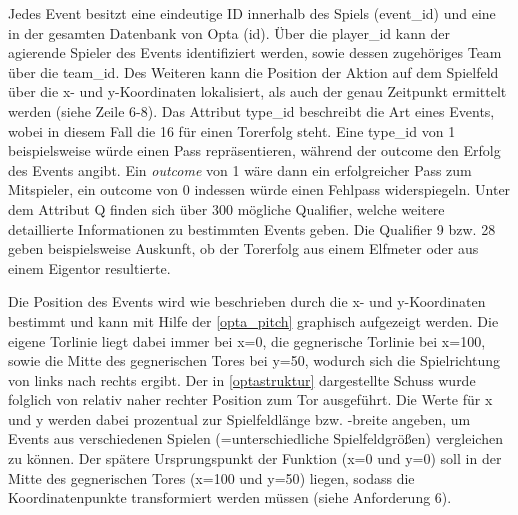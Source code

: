 Jedes Event besitzt eine eindeutige ID innerhalb des Spiels (\textsf{\glqq event\_id\grqq}) und eine in der gesamten Datenbank von Opta (\textsf{\glqq id\grqq}). Über die \textsf{\glqq player\_id\grqq} kann der agierende Spieler des Events identifiziert werden, sowie dessen zugehöriges Team über die \textsf{\glqq team\_id\grqq}. Des Weiteren kann die Position der Aktion auf dem Spielfeld über die \textsf{\glqq x\grqq}- und \textsf{\glqq y\grqq}-Koordinaten lokalisiert, als auch der genau Zeitpunkt ermittelt werden (siehe Zeile 6-8). Das Attribut \textsf{\glqq type\_id\grqq} beschreibt die Art eines Events, wobei in diesem Fall die \textsf{16} für einen Torerfolg steht. Eine \textsf{\glqq type\_id\grqq} von \textsf{1} beispielsweise würde einen Pass repräsentieren, während der \textsf{\glqq outcome\grqq} den Erfolg des Events angibt. Ein \textit{\glqq outcome\grqq} von \textsf{1} wäre dann ein erfolgreicher Pass zum Mitspieler, ein \textsf{\glqq outcome\grqq} von \textsf{0} indessen würde einen Fehlpass widerspiegeln. Unter dem Attribut \textsf{\glqq Q\grqq} finden sich über 300 mögliche Qualifier, welche weitere detaillierte Informationen zu bestimmten Events geben. Die Qualifier \textsf{9} bzw. \textsf{28} geben beispielsweise Auskunft, ob der Torerfolg aus einem Elfmeter oder aus einem Eigentor resultierte.
\enlargethispage{2\baselineskip} 

Die Position des Events wird wie beschrieben durch die \textsf{\glqq x\grqq}- und \textsf{\glqq y\grqq}-Koordinaten bestimmt und kann mit Hilfe der \vref{opta_pitch} graphisch aufgezeigt werden. Die eigene Torlinie liegt dabei immer bei \textsf{x=0}, die gegnerische Torlinie bei \textsf{x=100}, sowie die Mitte des gegnerischen Tores bei \textsf{y=50}, wodurch sich die Spielrichtung von links nach rechts ergibt. Der in \vref{optastruktur} dargestellte Schuss wurde folglich von relativ naher rechter Position zum Tor ausgeführt. Die Werte für x und y werden dabei prozentual zur Spielfeldlänge bzw. -breite angeben, um Events aus verschiedenen Spielen (=unterschiedliche Spielfeldgrößen) vergleichen zu können. Der spätere Ursprungspunkt der Funktion (\textsf{x=0} und \textsf{y=0}) soll in der Mitte des gegnerischen Tores (\textsf{x=100} und \textsf{y=50}) liegen, sodass die Koordinatenpunkte transformiert werden müssen (siehe Anforderung 6).

